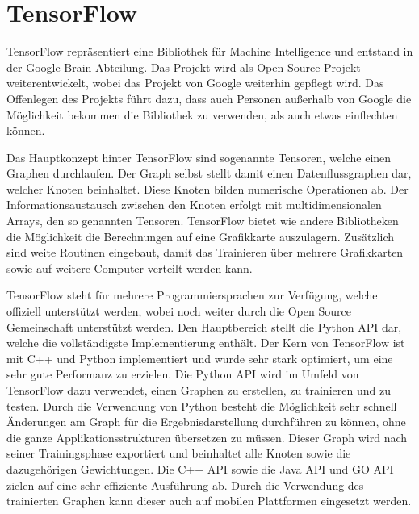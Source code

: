 \chapter{TensorFlow}
\label{cha:TensorFlow}

TensorFlow repräsentiert eine Bibliothek für Machine Intelligence und entstand in der Google Brain Abteilung.
Das Projekt wird als Open Source Projekt weiterentwickelt, wobei das Projekt von Google weiterhin gepflegt wird. 
Das Offenlegen des Projekts führt dazu, dass auch Personen außerhalb von Google die Möglichkeit bekommen die Bibliothek zu verwenden, als auch etwas einflechten können. \newline

\noindent
Das Hauptkonzept hinter TensorFlow sind sogenannte Tensoren, welche einen Graphen durchlaufen. 
Der Graph selbst stellt damit einen Datenflussgraphen dar, welcher Knoten beinhaltet. 
Diese Knoten bilden numerische Operationen ab.
Der Informationsaustausch zwischen den Knoten erfolgt mit multidimensionalen Arrays, den so genannten Tensoren.
TensorFlow bietet wie andere Bibliotheken die Möglichkeit die Berechnungen auf eine Grafikkarte auszulagern.
Zusätzlich sind weite Routinen eingebaut, damit das Trainieren über mehrere Grafikkarten sowie auf weitere Computer verteilt werden kann. \newline

\noindent
TensorFlow steht für mehrere Programmiersprachen zur Verfügung, welche offiziell unterstützt werden, wobei noch weiter durch die Open Source Gemeinschaft unterstützt werden.
Den Hauptbereich stellt die Python API dar, welche die vollständigste Implementierung enthält. 
Der Kern von TensorFlow ist mit C++ und Python implementiert und wurde sehr stark optimiert, um eine sehr gute Performanz zu erzielen.
Die Python API wird im Umfeld von TensorFlow dazu verwendet, einen Graphen zu erstellen, zu trainieren und zu testen. 
Durch die Verwendung von Python besteht die Möglichkeit sehr schnell Änderungen am Graph für die Ergebnisdarstellung durchführen zu können, ohne die ganze Applikationsstrukturen übersetzen zu müssen. 
Dieser Graph wird nach seiner Trainingsphase exportiert und beinhaltet alle Knoten sowie die dazugehörigen Gewichtungen. 
Die C++ API sowie die Java API und GO API zielen auf eine sehr effiziente Ausführung ab.
Durch die Verwendung des trainierten Graphen kann dieser auch auf mobilen Plattformen eingesetzt werden.

